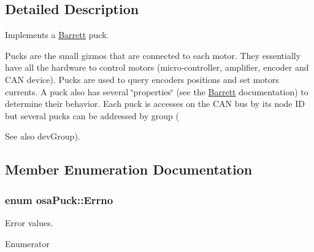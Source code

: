 \subsection{Detailed Description}
Implements a \hyperlink{struct_barrett}{Barrett} puck. 

Pucks are the small gizmos that are connected to each motor. They essentially have all the hardware to control motors (micro-\/controller, amplifier, encoder and C\+A\+N device). Pucks are used to query encoders positions and set motors currents. A puck also has several \char`\"{}properties\char`\"{} (see the \hyperlink{struct_barrett}{Barrett} documentation) to determine their behavior. Each puck is accesses on the C\+A\+N bus by its node I\+D but several pucks can be addressed by group (\begin{DoxySeeAlso}{See also}
dev\+Group). 
\end{DoxySeeAlso}


\subsection{Member Enumeration Documentation}
\hypertarget{classosa_puck_af19c88d20083577d3a676353b4902391}{}
\subsubsection[{Errno}]{\setlength{\rightskip}{0pt plus 5cm}enum {\bf osa\+Puck\+::\+Errno}}\label{classosa_puck_af19c88d20083577d3a676353b4902391}


Error values. 

\begin{Desc}
\item[Enumerator]\par
\begin{description}
\item[{\em 
\hypertarget{classosa_puck_af19c88d20083577d3a676353b4902391ade248d33c01e1fb3444c3aa6d9e6c1ae}{}E\+S\+U\+C\+C\+E\+S\+S\label{classosa_puck_af19c88d20083577d3a676353b4902391ade248d33c01e1fb3444c3aa6d9e6c1ae}
}]\item[{\em 
\hypertarget{classosa_puck_af19c88d20083577d3a676353b4902391a5aff629d7cc5592d2c7a94b756f6a741}{}E\+F\+A\+I\+L\+U\+R\+E\label{classosa_puck_af19c88d20083577d3a676353b4902391a5aff629d7cc5592d2c7a94b756f6a741}
}]\end{description}
\end{Desc}
\hypertarget{classosa_puck_aa484456bae759574accdc76fe68b4685}{}
